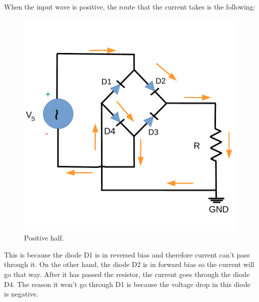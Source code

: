 When the input wave is positive, the route that the current takes is the following:
\begin{figure}[h] \centering
    \includegraphics[scale=0.4]{lab3 _positive.pdf}
    \caption{Positive half.}
    \label{fig:rc2}
\end{figure}

This is because the diode D1 is in reversed bias and therefore
current can't pass through it. On the other hand, the diode D2 is in forward bias
so the current will go that way.
After it has passed the resistor, the current goes through the diode D4.
The reason it won't go through D1 is because the voltage drop in this diode
is negative.


